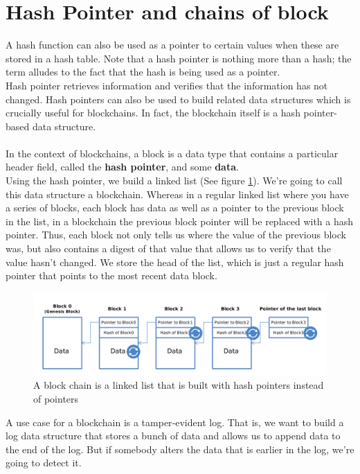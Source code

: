 \section{Hash Pointer and chains of block}
A hash function can also be used as a pointer to certain values when these are stored in a hash table. Note that a hash pointer is nothing more than a hash; the term alludes to the fact that the hash is being used as a pointer.\\
Hash pointer retrieves information and verifies that the information has not changed. Hash pointers can also be used to build related data structures which is crucially useful for blockchains. In fact, the blockchain itself is a hash pointer-based data structure. \\\\
In the context of blockchains, a block is a data type that contains a particular header field, called the \textbf{hash pointer}, and some \textbf{data}.\\
Using the hash pointer, we build a linked list (See figure \ref{fig:f1}). We’re going to call this data structure a blockchain. Whereas in a regular linked list where you have a series of blocks, each block has data as well as a pointer to the previous block in the list, in a blockchain the previous block pointer will be replaced with a hash pointer. Thus, each block not only tells us where the value of the previous block was, but also contains a digest of that value that allows us to verify that the value hasn’t changed. We store the head of the list, which is just a regular hash pointer that points to the most recent data block.
\begin{center}
	\begin{figure}
		\centering
		\includegraphics[width=0.8\linewidth]{Fig/02/F1}
		\caption{A block chain is a linked list that is built with hash pointers instead of pointers}
		\label{fig:f1}
	\end{figure}
\end{center}
A use case for a blockchain is a tamper‐evident log. That is, we want to build a log data structure that stores a bunch of data and allows us to append data to the end of the log. But if somebody alters the data that is earlier in the log, we’re going to detect it.\\\\
